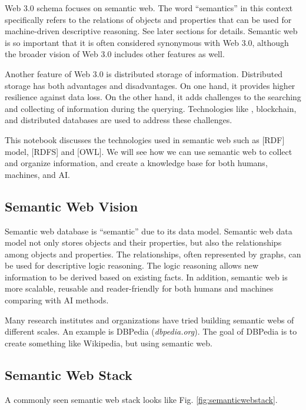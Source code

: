 Web 3.0 schema focuses on semantic web. The word ``semantics'' in this context specifically refers to the relations of objects and properties that can be used for machine-driven descriptive reasoning. See later sections for details. Semantic web is so important that it is often considered synonymous with Web 3.0, although the broader vision of Web 3.0 includes other features as well.

Another feature of Web 3.0 is distributed storage of information. Distributed storage has both advantages and disadvantages. On one hand, it provides higher resilience against data loss. On the other hand, it adds challenges to the searching and collecting of information during the querying. Technologies like , blockchain, and distributed databases are used to address these challenges.

This notebook discusses the technologies used in semantic web such as [RDF] model, [RDFS] and [OWL]. We will see how we can use semantic web to collect and organize information, and create a knowledge base for both humans, machines, and AI.

\subsection{Semantic Web Vision}

Semantic web database is ``semantic'' due to its data model. Semantic web data model not only stores objects and their properties, but also the relationships among objects and properties. The relationships, often represented by graphs, can be used for descriptive logic reasoning. The logic reasoning allows new information to be derived based on existing facts. In addition, semantic web is more scalable, reusable and reader-friendly for both humans and machines comparing with AI methods.

Many research institutes and organizations have tried building semantic webs of different scales. An example is DBPedia (\textit{dbpedia.org}). The goal of DBPedia is to create something like Wikipedia, but using semantic web.

\subsection{Semantic Web Stack} \label{subsec:semanticwebstack}

A commonly seen semantic web stack looks like Fig. \ref{fig:semanticwebstack}. 

